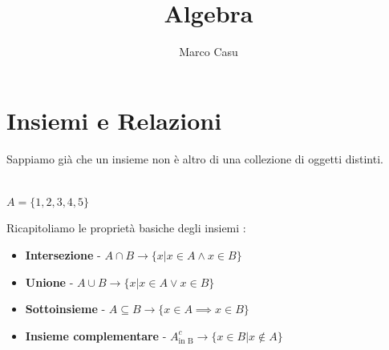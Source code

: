 \documentclass[12pt, letterpaper]{article}
\title{Algebra}
\author{Marco Casu}
\date{\vspace{-5ex}}
\begin{document}
\newcommand{\omo}[1]{\(\varphi\)}


\maketitle
\begin{figure}[h]
\end{figure}
\newpage 
\tableofcontents
\newpage
\section{Insiemi e Relazioni}
Sappiamo già che un insieme non è altro di una collezione di oggetti distinti.\raggedright\\
\centering
\(A=\{1,2,3,4,5\}\)\\
\raggedright
Ricapitoliamo le proprietà basiche degli insiemi : 
\begin{itemize}
    \item \textbf{Intersezione} - \(A \cap B \rightarrow \{x | x\in A \land x\in B\}\)
    \item \textbf{Unione} - \(A \cup B \rightarrow \{x | x\in A \lor x\in B\}\)  
    \item \textbf{Sottoinsieme} - \(A \subseteq B \rightarrow  \{x\in A \implies x \in B\}\)
    \item \textbf{Insieme complementare} - \(A^c_{\text{in B}} \rightarrow \{x\in B | x \notin A\}\)
\end{itemize}
\end{document}
